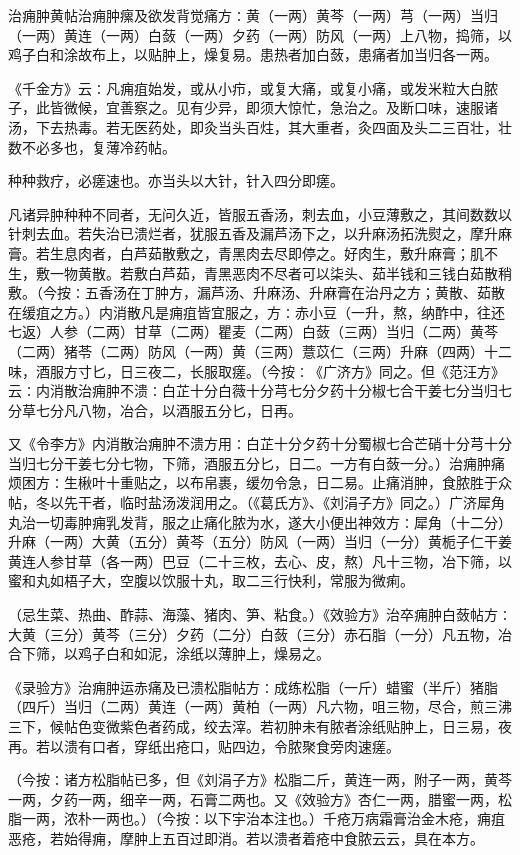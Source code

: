 \documentclass[a4paper,12pt,UTF8,twoside]{ctexbook}
\begin{document}
治痈肿黄帖治痈肿瘰及欲发背觉痛方∶黄（一两）黄芩（一两）芎（一两）当归（一两）黄连（一两）白蔹（一两）夕药（一两）防风（一两）上八物，捣筛，以鸡子白和涂故布上，以贴肿上，燥复易。患热者加白蔹，患痛者加当归各一两。

《千金方》云∶凡痈疽始发，或从小疖，或复大痛，或复小痛，或发米粒大白脓子，此皆微候，宜善察之。见有少异，即须大惊忙，急治之。及断口味，速服诸汤，下去热毒。若无医药处，即灸当头百炷，其大重者，灸四面及头二三百壮，壮数不必多也，复薄冷药帖。

种种救疗，必瘥速也。亦当头以大针，针入四分即瘥。

凡诸异肿种种不同者，无问久近，皆服五香汤，刺去血，小豆薄敷之，其间数数以针刺去血。若失治已溃烂者，犹服五香及漏芦汤下之，以升麻汤拓洗熨之，摩升麻膏。若生息肉者，白芦茹散敷之，青黑肉去尽即停之。好肉生，敷升麻膏；肌不生，敷一物黄散。若敷白芦茹，青黑恶肉不尽者可以柒头、茹半钱和三钱白茹散稍敷。（今按∶五香汤在丁肿方，漏芦汤、升麻汤、升麻膏在治丹之方；黄散、茹散在缓疽之方。）内消散凡是痈疽皆宜服之，方∶赤小豆（一升，熬，纳酢中，往还七返）人参（二两）甘草（二两）瞿麦（二两）白蔹（三两）当归（二两）黄芩（二两）猪苓（二两）防风（一两）黄（三两）薏苡仁（三两）升麻（四两）十二味，酒服方寸匕，日三夜二，长服取瘥。（今按∶《广济方》同之。但《范汪方》云∶内消散治痈肿不溃∶白芷十分白薇十分芎七分夕药十分椒七合干姜七分当归七分草七分凡八物，冶合，以酒服五分匕，日再。

又《令李方》内消散治痈肿不溃方用∶白芷十分夕药十分蜀椒七合芒硝十分芎十分当归七分干姜七分七物，下筛，酒服五分匕，日二。一方有白蔹一分。）治痈肿痛烦困方∶生楸叶十重贴之，以布帛裹，缓勿令急，日二易。止痛消肿，食脓胜于众帖，冬以先干者，临时盐汤泼润用之。（《葛氏方》、《刘涓子方》同之。）广济犀角丸治一切毒肿痈乳发背，服之止痛化脓为水，遂大小便出神效方∶犀角（十二分）升麻（一两）大黄（五分）黄芩（五分）防风（一两）当归（一分）黄栀子仁干姜黄连人参甘草（各一两）巴豆（二十三枚，去心、皮，熬）凡十三物，冶下筛，以蜜和丸如梧子大，空腹以饮服十丸，取二三行快利，常服为微痢。

（忌生菜、热曲、酢蒜、海藻、猪肉、笋、粘食。）《效验方》治卒痈肿白蔹帖方∶大黄（三分）黄芩（三分）夕药（二分）白蔹（三分）赤石脂（一分）凡五物，冶合下筛，以鸡子白和如泥，涂纸以薄肿上，燥易之。

《录验方》治痈肿运赤痛及已溃松脂帖方∶成练松脂（一斤）蜡蜜（半斤）猪脂（四斤）当归（二两）黄连（一两）黄柏（一两）凡六物，咀三物，尽合，煎三沸三下，候帖色变微紫色者药成，绞去滓。若初肿未有脓者涂纸贴肿上，日三易，夜再。若以溃有口者，穿纸出疮口，贴四边，令脓聚食旁肉速瘥。

（今按∶诸方松脂帖已多，但《刘涓子方》松脂二斤，黄连一两，附子一两，黄芩一两，夕药一两，细辛一两，石膏二两也。又《效验方》杏仁一两，腊蜜一两，松脂一两，浓朴一两也。）（今按∶以下宇治本注也。）千疮万病霜膏治金木疮，痈疽恶疮，若始得痈，摩肿上五百过即消。若以溃者着疮中食脓云云，具在本方。
\end{document}
